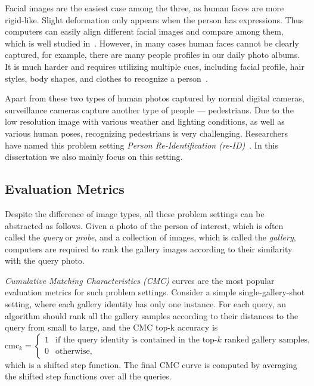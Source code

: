 Facial images are the easiest case among the three, as human faces are more rigid-like. Slight deformation only appears when the person has expressions. Thus computers can easily align different facial images and compare among them, which is well studied in~\cite{sun2014deep1,sun2014deep2,taigman2014deepface,parkhi2015deep}. However, in many cases human faces cannot be clearly captured, for example, there are many people profiles in our daily photo albums. It is much harder and requires utilizing multiple cues, including facial profile, hair styles, body shapes, and clothes to recognize a person~\cite{zhang2015beyond}.

Apart from these two types of human photos captured by normal digital cameras, surveillance cameras capture another type of people --- pedestrians. Due to the low resolution image with various weather and lighting conditions, as well as various human poses, recognizing pedestrians is very challenging. Researchers have named this problem setting \emph{Person Re-Identification (re-ID)}~\cite{zajdel2005keeping}. In this dissertation we also mainly focus on this setting.

\subsection{Evaluation Metrics} %
\label{sub:human-id-eval-metrics}
Despite the difference of image types, all these problem settings can be abstracted as follows. Given a photo of the person of interest, which is often called the \emph{query} or \emph{probe}, and a collection of images, which is called the \emph{gallery}, computers are required to rank the gallery images according to their similarity with the query photo.

\emph{Cumulative Matching Characteristics (CMC)} curves are the most popular evaluation metrics for such problem settings. Consider a simple single-gallery-shot setting, where each gallery identity has only one instance. For each query, an algorithm should rank all the gallery samples according to their distances to the query from small to large, and the CMC top-k accuracy is
\begin{equation}
  \mathrm{cmc}_k = \begin{cases}
    1 & \text{if the query identity is contained in the top-$k$ ranked gallery samples,} \\
    0 & \text{otherwise},
  \end{cases}
\end{equation}
which is a shifted step function. The final CMC curve is computed by averaging the shifted step functions over all the queries.

